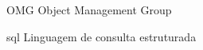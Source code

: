 \begin{siglas}
  \item[OMG] Object Management Group
  \item[sql] Linguagem de consulta estruturada
\end{siglas}
